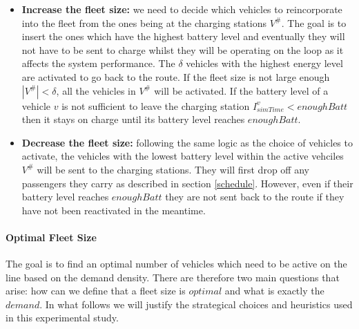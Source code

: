 \documentclass[12pt,a4paper]{article}
\begin{document}
\begin{itemize}
\setlength\itemsep{1pt}
\item \textbf{Increase the fleet size:} we need to decide which vehicles to reincorporate into the fleet from the ones being at the charging stations $V^{\#}$. The goal is to insert the ones which have the highest battery level and eventually they will not have to be sent to charge whilst they will be operating on the loop as it affects the system performance. The $\delta$ vehicles with the highest energy level are activated to go back to the route. If the fleet size is not large enough $|V^{\#}| < \delta$, all the vehicles in $V^{\#}$ will be activated. If the battery level of a vehicle $v$ is not sufficient to leave the charging station $I_{simTime}^{v} < enoughBatt$ then it stays on charge until its battery level reaches $enoughBatt$.
\item \textbf{Decrease the fleet size:} following the same logic as the choice of vehicles to activate, the vehicles with the lowest battery level within the active vehciles $V^{\#}$ will be sent to the charging stations. They will first drop off any passengers they carry as described in section \ref{schedule}. However, even if their battery level reaches $enoughBatt$ they are not sent back to the route if they have not been reactivated in the meantime.
\end{itemize}

\paragraph{Optimal Fleet Size} The goal is to find an optimal number of vehicles which need to be active on the line based on the demand density. There are therefore two main questions that arise: how can we define that a fleet size is $optimal$ and what is exactly the $demand$. In what follows we will justify the strategical choices and heuristics used in this experimental study.
\end{document}
